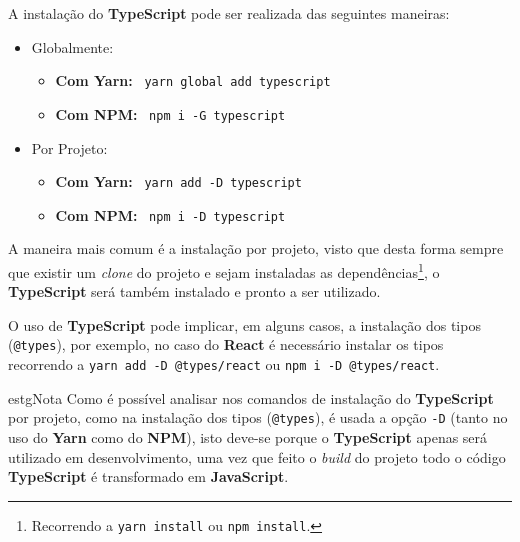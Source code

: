 
A instalação do \textbf{TypeScript} pode ser realizada das seguintes maneiras:

\begin{itemize}
	\item Globalmente:
	\begin{itemize}
		\item \textbf{Com Yarn:} ~\texttt{yarn global add typescript}
		\item \textbf{Com NPM:} ~\texttt{npm i -G typescript}
	\end{itemize}
	\item Por Projeto:
	\begin{itemize}
		\item \textbf{Com Yarn:} ~\texttt{yarn add -D typescript}
		\item \textbf{Com NPM:} ~\texttt{npm i -D typescript}
	\end{itemize}
\end{itemize}

A maneira mais comum é a instalação por projeto, visto que desta forma sempre que existir um \textit{clone} do projeto e sejam instaladas as dependências\footnote{Recorrendo a \texttt{yarn install} ou \texttt{npm install}.}, o \textbf{TypeScript} será também instalado e pronto a ser utilizado.

O uso de \textbf{TypeScript} pode implicar, em alguns casos, a instalação dos tipos (\texttt{@types}), por exemplo, no caso do \textbf{React} é necessário instalar os tipos recorrendo a \texttt{yarn add -D @types/react} ou \texttt{npm i -D @types/react}.

\begin{mybox}{estg}{Nota}
	Como é possível analisar nos comandos de instalação do \textbf{TypeScript} por projeto, como na instalação dos tipos (\texttt{@types}), é usada a opção \texttt{-D} (tanto no uso do \textbf{Yarn} como do \textbf{NPM}), isto deve-se porque o \textbf{TypeScript} apenas será utilizado em desenvolvimento, uma vez que feito o \textit{build} do projeto todo o código \textbf{TypeScript} é transformado em \textbf{JavaScript}.
\end{mybox}